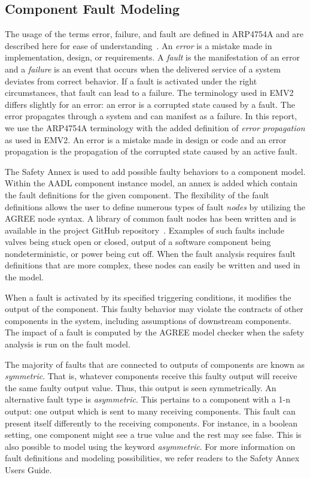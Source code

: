 \subsection{Component Fault Modeling}

The usage of the terms error, failure, and fault are defined in ARP4754A and are described here for ease of understanding~\cite{SAE:ARP4754A}. An \textit{error} is a mistake made in implementation, design, or requirements. A \textit{fault} is the manifestation of an error and a \textit{failure} is an event that occurs when the delivered service of a system deviates from correct behavior. If a fault is activated under the right circumstances, that fault can lead to a failure. The terminology used in EMV2 differs slightly for an error: an error is a corrupted state caused by a fault. The error propagates through a system and can  manifest as a failure. In this report, we use the ARP4754A terminology with the added definition of \textit{error propagation} as used in EMV2. An error is a mistake made in design or code and an error propagation is the propagation of the corrupted state caused by an active fault. 

The Safety Annex is used to add possible faulty behaviors to a component model. Within the AADL component instance model, an annex is added which contain the fault definitions for the given component. The flexibility of the fault definitions allows the user to define numerous types of fault \textit{nodes} by utilizing the AGREE node syntax. A library of common fault nodes has been written and is available in the project GitHub repository~\cite{SAGithub}. Examples of such faults include valves being stuck open or closed, output of a software component being nondeterministic, or power being cut off.  When the fault analysis requires fault definitions that are more complex, these nodes can easily be written and used in the model. 

When a fault is activated by its specified triggering conditions, it modifies the output of the component. This faulty behavior may violate the contracts of other components in the system, including assumptions of downstream components. The impact of a fault is computed by the AGREE model checker when the safety analysis is run on the fault model. 

The majority of faults that are connected to outputs of components are known as \textit{symmetric}. That is, whatever components receive this faulty output will receive the same faulty output value. Thus, this output is seen symmetrically. An alternative fault type is \textit{asymmetric}. This pertains to a component with a 1-n output: one output which is sent to many receiving components. This fault can present itself differently to the receiving components. For instance, in a boolean setting, one component might see a true value and the rest may see false. This is also possible to model using the keyword \textit{asymmetric}. For more information on fault definitions and modeling possibilities, we refer readers to the Safety Annex Users Guide\cite{SAGithub}.

